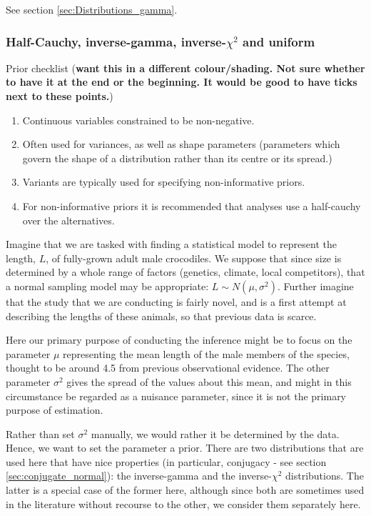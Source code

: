 \documentclass[11pt,fullpage]{book}
\begin{document}
See section \ref{sec:Distributions_gamma}.


\subsubsection{Half-Cauchy, inverse-gamma, inverse-$\chi^2$ and uniform}\label{sec:Distributions_halfCauchyInvGamma}
Prior checklist (\textbf{want this in a different colour/shading. Not sure whether to have it at the end or the beginning. It would be good to have ticks next to these points.})

\begin{enumerate} 
\item Continuous variables constrained to be non-negative.
\item Often used for variances, as well as shape parameters (parameters which govern the shape of a distribution rather than its centre or its spread.)
\item Variants are typically used for specifying non-informative priors.
\item For non-informative priors it is recommended that analyses use a half-cauchy over the alternatives.
\end{enumerate}

Imagine that we are tasked with finding a statistical model to represent the length, $L$, of fully-grown adult male crocodiles. We suppose that since size is determined by a whole range of factors (genetics, climate, local competitors), that a normal sampling model may be appropriate: $L\sim N(\mu,\sigma^2)$. Further imagine that the study that we are conducting is fairly novel, and is a first attempt at describing the lengths of these animals, so that previous data is scarce.

Here our primary purpose of conducting the inference might be to focus on the parameter $\mu$ representing the mean length of the male members of the species, thought to be around 4.5 from previous observational evidence. The other parameter $\sigma^2$ gives the spread of the values about this mean, and might in this circumstance be regarded as a nuisance parameter, since it is not the primary purpose of estimation.

Rather than set $\sigma^2$ manually, we would rather it be determined by the data. Hence, we want to set the parameter a prior. There are two distributions that are used here that have nice properties (in particular, conjugacy - see section \ref{sec:conjugate_normal}): the inverse-gamma and the inverse-$\chi^2$ distributions. The latter is a special case of the former here, although since both are sometimes used in the literature without recourse to the other, we consider them separately here.
\end{document}
